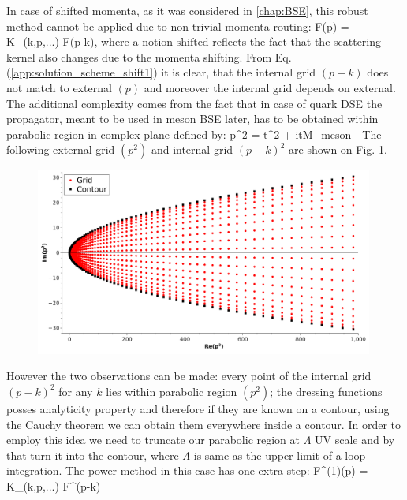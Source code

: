 In case of shifted momenta, as it was considered in \ref{chap:BSE}, this robust method cannot be applied due to non-trivial momenta routing:
\beqa
F(p) = K_{}(k,p,...) \otimes F(p-k)\;, 
\label{app:solution_scheme_shift1}
\eeqa
where a notion $\text{shifted}$ reflects the fact that the scattering kernel also changes due to the momenta shifting. From Eq.(\ref{app:solution_scheme_shift1}) it is clear, that the internal grid $(p-k)$ does not match to external $(p)$ and moreover the internal grid depends on external. The additional complexity comes from the fact that in case of quark DSE the propagator, meant to be used in meson BSE later, has to be obtained within parabolic region in complex plane defined by:
\beqa
	p^2 = t^2 + itM_{meson} -  
	\label{app:contour}
\eeqa
The following external grid $(p^2)$ and internal grid $(p-k)^2$ are shown on Fig. \ref{fig:contour2}. 
\begin{figure}[h]
\begin{center}
\includegraphics[width=0.99\textwidth]{figures/Grid_to_Contour}
\caption{\footnotesize }\label{fig:contour2}
\end{center}
\end{figure}
However the two observations can be made: every point of the internal grid $(p-k)^2$ for any $k$ lies within parabolic region $(p^2)$; the dressing functions posses analyticity property and therefore if they are known on a contour, using the Cauchy theorem we can obtain them everywhere inside a contour. In order to employ this idea we need to truncate our parabolic region at $\Lambda$ UV scale and by that turn it into the contour, where $\Lambda$ is same as the upper limit of a loop integration. The power method in this case has one extra step:
\beqa
\label{app:solution_scheme_shift2}
F^{(1)}(p) = K_{}(k,p,...) \otimes F^{}(p-k) \\
